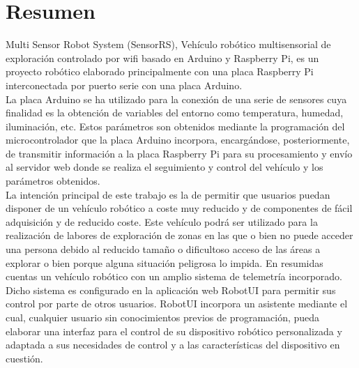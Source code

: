 

\section*{Resumen}
\label{resumen}

Multi Sensor Robot System (SensorRS), Vehículo robótico multisensorial de exploración controlado por wifi basado en Arduino y Raspberry Pi, es un proyecto robótico elaborado
principalmente con una placa Raspberry Pi interconectada por puerto serie con una placa Arduino. \\

La placa Arduino se ha utilizado para la conexión de una serie de sensores cuya
finalidad es la obtención de variables del entorno como temperatura, humedad, iluminación, etc. Estos parámetros son obtenidos mediante la programación del microcontrolador 
que la placa Arduino incorpora, encargándose, posteriormente, de transmitir información a la placa Raspberry Pi para su procesamiento y envío al servidor web donde se realiza
el seguimiento y control del vehículo y los parámetros obtenidos.\\

La intención principal de este trabajo es la de permitir que usuarios puedan disponer de un vehículo robótico a coste muy reducido y de componentes de fácil adquisición y
de reducido coste. Este vehículo podrá ser utilizado para la realización de labores de exploración de zonas en las que o bien no puede acceder una persona debido al reducido tamaño o 
dificultoso acceso de las áreas a explorar o bien porque alguna situación peligrosa lo impida. En resumidas cuentas un vehículo robótico con un amplio sistema de telemetría incorporado.\\

Dicho sistema es configurado en la aplicación web RobotUI para permitir sus control por parte de otros usuarios. RobotUI incorpora un asistente mediante el cual, cualquier usuario 
sin conocimientos previos de programación, pueda elaborar una interfaz para el control de su dispositivo robótico personalizada y adaptada a sus necesidades de control 
y a las características del dispositivo en cuestión.\\

